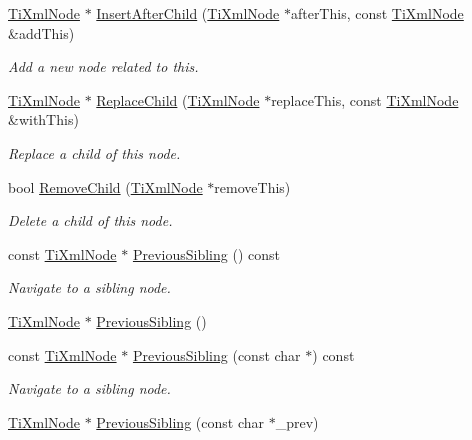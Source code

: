 \begin{DoxyCompactItemize}
\hyperlink{class_ti_xml_node}{TiXmlNode} $\ast$ \hyperlink{class_ti_xml_node_a274db3292218202805c093f66a964cb5}{InsertAfterChild} (\hyperlink{class_ti_xml_node}{TiXmlNode} $\ast$afterThis, const \hyperlink{class_ti_xml_node}{TiXmlNode} \&addThis)
\begin{DoxyCompactList}\small\item\em Add a new node related to this. \end{DoxyCompactList}\item 
\hyperlink{class_ti_xml_node}{TiXmlNode} $\ast$ \hyperlink{class_ti_xml_node_a543208c2c801c84a213529541e904b9f}{ReplaceChild} (\hyperlink{class_ti_xml_node}{TiXmlNode} $\ast$replaceThis, const \hyperlink{class_ti_xml_node}{TiXmlNode} \&withThis)
\begin{DoxyCompactList}\small\item\em Replace a child of this node. \end{DoxyCompactList}\item 
bool \hyperlink{class_ti_xml_node_ae19d8510efc90596552f4feeac9a8fbf}{RemoveChild} (\hyperlink{class_ti_xml_node}{TiXmlNode} $\ast$removeThis)
\begin{DoxyCompactList}\small\item\em Delete a child of this node. \end{DoxyCompactList}\item 
const \hyperlink{class_ti_xml_node}{TiXmlNode} $\ast$ \hyperlink{class_ti_xml_node_ac2cd892768726270e511b2ab32de4d10}{PreviousSibling} () const 
\begin{DoxyCompactList}\small\item\em Navigate to a sibling node. \end{DoxyCompactList}\item 
\hyperlink{class_ti_xml_node}{TiXmlNode} $\ast$ \hyperlink{class_ti_xml_node_af8c0642ad6ecc03f62953e68896ed1cc}{PreviousSibling} ()
\item 
const \hyperlink{class_ti_xml_node}{TiXmlNode} $\ast$ \hyperlink{class_ti_xml_node_abbb3b8c1f38fa7b9e52d584a4aeca795}{PreviousSibling} (const char $\ast$) const 
\begin{DoxyCompactList}\small\item\em Navigate to a sibling node. \end{DoxyCompactList}\item 
\hyperlink{class_ti_xml_node}{TiXmlNode} $\ast$ \hyperlink{class_ti_xml_node_a4df5db99654be4496f1a02b01dc98638}{PreviousSibling} (const char $\ast$\_\-prev)
\item 

\end{DoxyCompactItemize}
